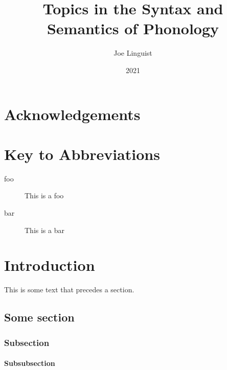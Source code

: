 \documentclass[lscape]{msu-thesis}
\title{Topics in the Syntax and Semantics of Phonology}
\author{Joe Linguist}
\date{2021}
\begin{document}
\frontmatter
\maketitlepage
\begin{publicabstract}
\lipsum[1]
\end{publicabstract}
\begin{abstract}
\lipsum[1-6]
\end{abstract}
\clearpage
\makecopyrightpage
\makededicationpage
\clearpage
\chapter*{Acknowledgements}
\DoubleSpacing
\lipsum[1]
\clearpage
\SingleSpacing
\tableofcontents* %
\clearpage
\listoftables
\clearpage
\listoffigures
\clearpage
\listoflistings
\clearpage
\chapter{Key to Abbreviations}
\vspace{\cftparskip} %
\begin{description}
\item[foo]  This is a foo
\item[bar] This is a bar
\end{description}
\mainmatter
\chapter{Introduction}
This is some text that precedes a section.
\section{Some section}
\lipsum[2]

\subsection{Subsection}
\lipsum
\subsubsection{Subsubsection}
\begin{exe}
\ex\label{1}
\begin{xlist}
\end{xlist}
\end{exe}
\end{document}
